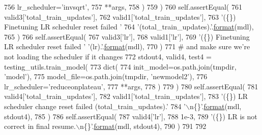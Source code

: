 \begin{DoxyCode}
756                 lr\_scheduler=\textcolor{stringliteral}{'invsqrt'},
757                 **args,
758             )
759         )
760         self.assertEqual(
761             valid3[\textcolor{stringliteral}{'total\_train\_updates'}],
762             valid1[\textcolor{stringliteral}{'total\_train\_updates'}],
763             \textcolor{stringliteral}{'(\{\}) Finetuning LR scheduler reset failed '}
764             \textcolor{stringliteral}{'(total\_train\_updates).'}.\hyperlink{namespaceparlai_1_1chat__service_1_1services_1_1messenger_1_1shared__utils_a32e2e2022b824fbaf80c747160b52a76}{format}(mdl),
765         )
766         self.assertEqual(
767             valid3[\textcolor{stringliteral}{'lr'}],
768             valid1[\textcolor{stringliteral}{'lr'}],
769             \textcolor{stringliteral}{'(\{\}) Finetuning LR scheduler reset failed '} \textcolor{stringliteral}{'(lr).'}.\hyperlink{namespaceparlai_1_1chat__service_1_1services_1_1messenger_1_1shared__utils_a32e2e2022b824fbaf80c747160b52a76}{format}(mdl),
770         )
771         \textcolor{comment}{# and make sure we're not loading the scheduler if it changes}
772         stdout4, valid4, test4 = testing\_utils.train\_model(
773             dict(
774                 init\_model=os.path.join(tmpdir, \textcolor{stringliteral}{'model'}),
775                 model\_file=os.path.join(tmpdir, \textcolor{stringliteral}{'newmodel2'}),
776                 lr\_scheduler=\textcolor{stringliteral}{'reduceonplateau'},
777                 **args,
778             )
779         )
780         self.assertEqual(
781             valid4[\textcolor{stringliteral}{'total\_train\_updates'}],
782             valid1[\textcolor{stringliteral}{'total\_train\_updates'}],
783             \textcolor{stringliteral}{'(\{\}) LR scheduler change reset failed (total\_train\_updates).'}
784             \textcolor{stringliteral}{'\(\backslash\)n\{\}'}.\hyperlink{namespaceparlai_1_1chat__service_1_1services_1_1messenger_1_1shared__utils_a32e2e2022b824fbaf80c747160b52a76}{format}(mdl, stdout4),
785         )
786         self.assertEqual(
787             valid4[\textcolor{stringliteral}{'lr'}],
788             1e-3,
789             \textcolor{stringliteral}{'(\{\}) LR is not correct in final resume.\(\backslash\)n\{\}'}.\hyperlink{namespaceparlai_1_1chat__service_1_1services_1_1messenger_1_1shared__utils_a32e2e2022b824fbaf80c747160b52a76}{format}(mdl, stdout4),
790         )
791 
792 
\end{DoxyCode}
